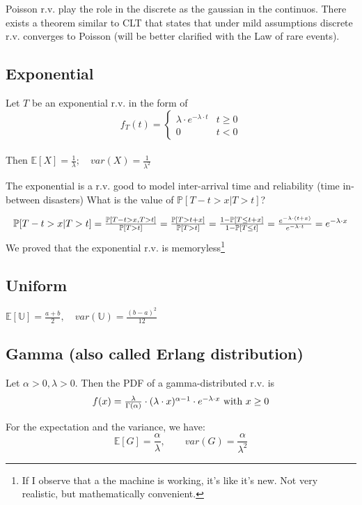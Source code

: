 Poisson r.v. play the role in the discrete as the gaussian in the continuos. There exists a theorem similar to CLT that states that under mild assumptions discrete r.v. converges to Poisson (will be better clarified with the Law of rare events).

\subsection{Exponential}
Let $T$ be an exponential r.v. in the form of
$$f_T(t)=
\begin{cases}
  \lambda \cdot e^{-\lambda \cdot t} & t \ge 0 \\
  0 & t <0
\end{cases}
$$
\\
Then $\mathbb{E}[X]= \frac{1}{\lambda}; \quad var(X)=\frac{1}{\lambda^2}$

The exponential is a r.v. good to model inter-arrival time and reliability (time in-between disasters)
What is the value of $\mathbb{P}[T-t > x | T>t]$?

\begin{equation}
  $$\mathbb{P}[T-t > x | T>t]=\frac{\mathbb{P}[T-t > x , T>t]}{\mathbb{P}[T>t]}=\frac{\mathbb{P}[T > t+x ]}{\mathbb{P}[T>t]}=\frac{1-\mathbb{P}[T \le t+x]}{1-\mathbb{P}[T\le t]}=\frac{e^{-\lambda \cdot (t+x)}}{e^{-\lambda \cdot t}} = e^{-\lambda \cdot x}$$
\end{equation}
We proved that the exponential r.v. is memoryless\footnote{If I observe that a the machine is working, it's like it's new. Not very realistic, but mathematically convenient.}

\subsection{Uniform}
$\mathbb{E}[\mathbb{U}]=\frac{a+b}{2},\quad var(\mathbb{U})=\frac{(b-a)^2}{12}$


\subsection{Gamma (also called Erlang distribution)}
Let $\alpha >0 , \lambda >0$. Then the PDF of a gamma-distributed r.v. is
\begin{equation}
  $$f(x) = \frac{\lambda}{\Gamma(\alpha)}\cdot (\lambda \cdot x)^{\alpha -1} \cdot e^{-\lambda \cdot x} \text{ with } x\ge 0$$
\end{equation}

For the expectation and the variance, we have: $$\mathbb{E}[G]=\frac{\alpha}{\lambda}, \qquad var(G)=\frac{\alpha}{\lambda^2}$$

